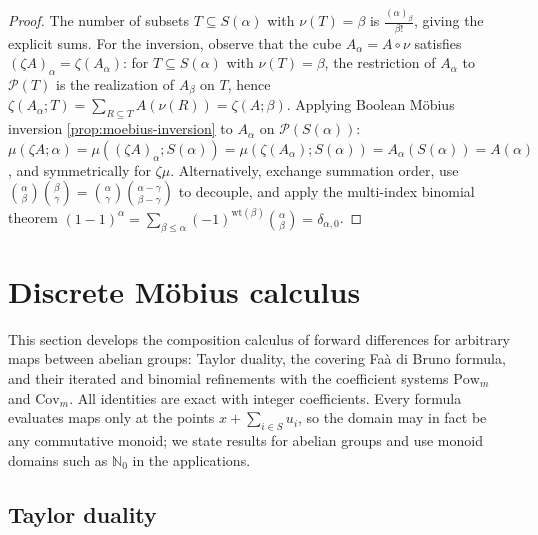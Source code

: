 \documentclass[10pt,a4paper]{article}
\theoremstyle{plain}
\theoremstyle{definition}
\newcommand{\IN}{\mathbb{N}} %
\newcommand{\1}{\mathbb{1}} %
\newcommand{\KP}{\mathcal{P}}
\newcommand{\Cov}{\mathrm{Cov}} %
\begin{document}
\begin{proof}

The number of subsets \(T \subseteq S(\alpha)\) with \(\nu(T) = \beta\)
is \(\frac{(\alpha)_\beta}{\beta!}\), giving the explicit sums. For the
inversion, observe that the cube \(A_\alpha = A \circ \nu\) satisfies
\((\zeta A)_\alpha = \zeta(A_\alpha)\): for \(T \subseteq S(\alpha)\)
with \(\nu(T) = \beta\), the restriction of \(A_\alpha\) to \(\KP(T)\)
is the realization of \(A_\beta\) on \(T\), hence
\(\zeta(A_\alpha; T) = \sum_{R \subseteq T} A(\nu(R)) = \zeta(A; \beta)\).
Applying Boolean Möbius inversion \ref{prop:moebius-inversion} to
\(A_\alpha\) on \(\KP(S(\alpha))\):
\(\mu(\zeta A; \alpha) = \mu((\zeta A)_\alpha; S(\alpha)) = \mu(\zeta(A_\alpha); S(\alpha)) = A_\alpha(S(\alpha)) = A(\alpha)\),
and symmetrically for \(\zeta \mu\). Alternatively, exchange summation
order, use
\(\binom{\alpha}{\beta}\binom{\beta}{\gamma} = \binom{\alpha}{\gamma}\binom{\alpha-\gamma}{\beta-\gamma}\)
to decouple, and apply the multi-index binomial theorem
\((1-1)^\alpha = \sum_{\beta \leq \alpha} (-1)^{\mathrm{wt}(\beta)} \binom{\alpha}{\beta} = \delta_{\alpha,0}\).

\end{proof}

\section{Discrete Möbius calculus}\label{discrete-muxf6bius-calculus}

This section develops the composition calculus of forward differences
for arbitrary maps between abelian groups: Taylor duality, the covering
Faà di Bruno formula, and their iterated and binomial refinements with
the coefficient systems \(\mathrm{Pow}_m\) and \(\Cov_m\). All
identities are exact with integer coefficients. Every formula evaluates
maps only at the points \(x + \sum_{i \in S} u_i\), so the domain may in
fact be any commutative monoid; we state results for abelian groups and
use monoid domains such as \(\IN_0\) in the applications.

\subsection{Taylor duality}\label{taylor-duality}
\end{document}
